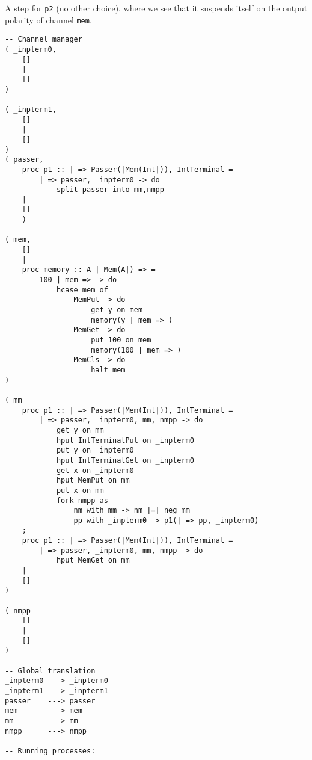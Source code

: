 \documentclass{article}
\theoremstyle{plain}%
\theoremstyle{definition}
\theoremstyle{remark}
\begin{document}
A step for \verb|p2| (no other choice), where we see that it suspends itself on the output polarity of channel \verb|mem|.
\begin{verbatim}
-- Channel manager
( _inpterm0,  
    []
    |
    []
)

( _inpterm1,  
    []
    |
    []
)
( passer,
    proc p1 :: | => Passer(|Mem(Int|)), IntTerminal = 
        | => passer, _inpterm0 -> do
            split passer into mm,nmpp 
    |
    []
    )

( mem,
    []
    |
    proc memory :: A | Mem(A|) => =
        100 | mem => -> do
            hcase mem of
                MemPut -> do
                    get y on mem
                    memory(y | mem => )
                MemGet -> do
                    put 100 on mem
                    memory(100 | mem => )
                MemCls -> do
                    halt mem
)

( mm
    proc p1 :: | => Passer(|Mem(Int|)), IntTerminal = 
        | => passer, _inpterm0, mm, nmpp -> do
            get y on mm
            hput IntTerminalPut on _inpterm0
            put y on _inpterm0
            hput IntTerminalGet on _inpterm0
            get x on _inpterm0
            hput MemPut on mm
            put x on mm
            fork nmpp as
                nm with mm -> nm |=| neg mm
                pp with _inpterm0 -> p1(| => pp, _inpterm0)
    ;
    proc p1 :: | => Passer(|Mem(Int|)), IntTerminal = 
        | => passer, _inpterm0, mm, nmpp -> do
            hput MemGet on mm 
    |
    []
)

( nmpp
    []
    |
    []
)

-- Global translation
_inpterm0 ---> _inpterm0 
_inpterm1 ---> _inpterm1 
passer    ---> passer 
mem       ---> mem
mm        ---> mm
nmpp      ---> nmpp

-- Running processes:

\end{verbatim}
\end{document}
